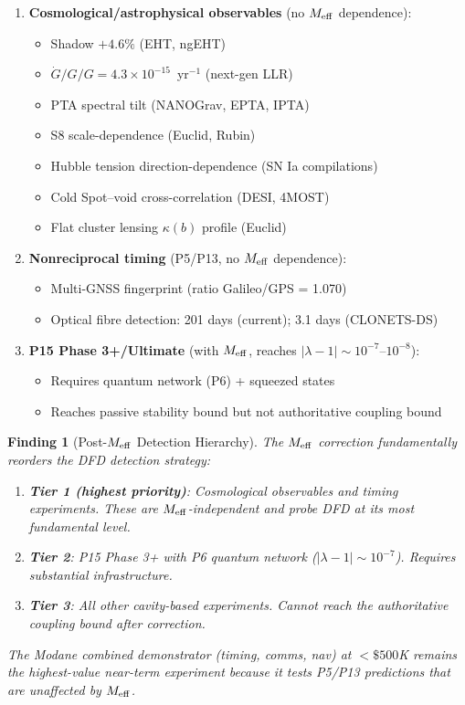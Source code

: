 \documentclass[11pt]{article}
\newtheorem{finding}{Finding}
\newcommand{\ee}[1]{\times 10^{#1}}
\newcommand{\Gdot}{\dot{G}/G}
\newcommand{\lambdaone}{|\lambda-1|}
\begin{document}
\begin{enumerate}[label=\arabic*.]
  \item \textbf{Cosmological/astrophysical observables} (no $M_{\rm eff}$
    dependence):
    \begin{itemize}[nosep]
      \item Shadow $+4.6\%$ (EHT, ngEHT)
      \item $\Gdot/G = 4.3\ee{-15}$~yr$^{-1}$ (next-gen LLR)
      \item PTA spectral tilt (NANOGrav, EPTA, IPTA)
      \item S8 scale-dependence (Euclid, Rubin)
      \item Hubble tension direction-dependence (SN Ia compilations)
      \item Cold Spot--void cross-correlation (DESI, 4MOST)
      \item Flat cluster lensing $\kappa(b)$ profile (Euclid)
    \end{itemize}

  \item \textbf{Nonreciprocal timing} (P5/P13, no $M_{\rm eff}$ dependence):
    \begin{itemize}[nosep]
      \item Multi-GNSS fingerprint (ratio Galileo/GPS = 1.070)
      \item Optical fibre detection: 201 days (current); 3.1 days (CLONETS-DS)
    \end{itemize}

  \item \textbf{P15 Phase 3+/Ultimate} (with $M_{\rm eff}$, reaches
    $\lambdaone \sim 10^{-7}$--$10^{-8}$):
    \begin{itemize}[nosep]
      \item Requires quantum network (P6) + squeezed states
      \item Reaches passive stability bound but not authoritative
        coupling bound
    \end{itemize}
\end{enumerate}

\begin{finding}[Post-$M_{\rm eff}$ Detection Hierarchy]
\label{find:detection-hierarchy}
The $M_{\rm eff}$ correction fundamentally reorders the DFD detection
strategy:
\begin{enumerate}[nosep]
  \item \textbf{Tier 1 (highest priority)}: Cosmological observables and
    timing experiments. These are $M_{\rm eff}$-independent and probe DFD
    at its most fundamental level.
  \item \textbf{Tier 2}: P15 Phase 3+ with P6 quantum network
    ($\lambdaone \sim 10^{-7}$). Requires substantial infrastructure.
  \item \textbf{Tier 3}: All other cavity-based experiments. Cannot reach
    the authoritative coupling bound after correction.
\end{enumerate}

The Modane combined demonstrator (timing, comms, nav) at $<\$500$K remains
the highest-value near-term experiment because it tests P5/P13 predictions
that are unaffected by $M_{\rm eff}$.
\end{finding}
\end{document}

